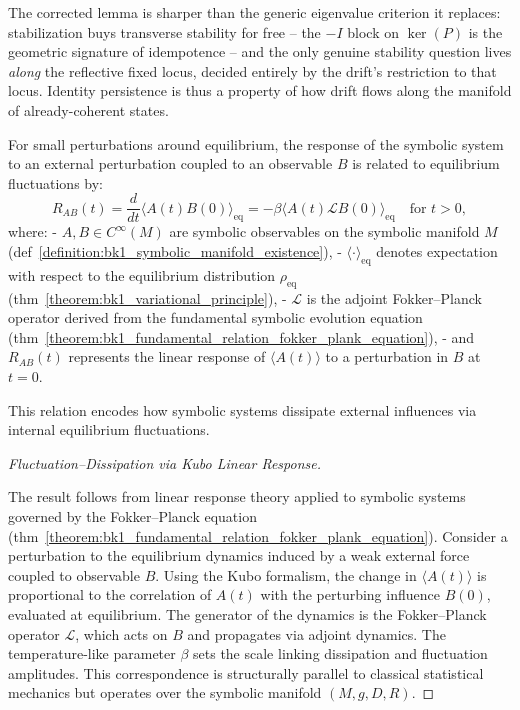 \begin{remark}
\label{remark:bk1_local_stability_interpretation}
The corrected lemma is sharper than the generic eigenvalue criterion it replaces: stabilization buys transverse stability for free -- the $-I$ block on $\ker(P)$ is the geometric signature of idempotence -- and the only genuine stability question lives \emph{along} the reflective fixed locus, decided entirely by the drift's restriction to that locus. Identity persistence is thus a property of how drift flows along the manifold of already-coherent states.
\end{remark}

\begin{theorem}
\label{theorem:bk1_symbolic_fluctuation_dissipation_relation}
For small perturbations around equilibrium, the response of the symbolic system to an external perturbation coupled to an observable $B$ is related to equilibrium fluctuations by:
\[
R_{AB}(t) = \frac{d}{dt} \langle A(t) B(0) \rangle_{\text{eq}} = -\beta \langle A(t) \mathcal{L} B(0) \rangle_{\text{eq}} \quad \text{for } t > 0,
\]
where:
- $A, B \in C^\infty(M)$ are symbolic observables on the symbolic manifold $M$ (def~\ref{definition:bk1_symbolic_manifold_existence}),
- $\langle \cdot \rangle_{\text{eq}}$ denotes expectation with respect to the equilibrium distribution $\rho_{\text{eq}}$ (thm~\ref{theorem:bk1_variational_principle}),
- $\mathcal{L}$ is the adjoint Fokker–Planck operator derived from the fundamental symbolic evolution equation (thm~\ref{theorem:bk1_fundamental_relation_fokker_plank_equation}),
- and $R_{AB}(t)$ represents the linear response of $\langle A(t) \rangle$ to a perturbation in $B$ at $t = 0$.

This relation encodes how symbolic systems dissipate external influences via internal equilibrium fluctuations.

\begin{proof}[Fluctuation--Dissipation via Kubo Linear Response]
\label{proof:bk1_sketch_fluctuation_dissipation}
\leavevmode

The result follows from linear response theory applied to symbolic systems governed by the Fokker–Planck equation (thm~\ref{theorem:bk1_fundamental_relation_fokker_plank_equation}). Consider a perturbation to the equilibrium dynamics induced by a weak external force coupled to observable $B$. Using the Kubo formalism, the change in $\langle A(t) \rangle$ is proportional to the correlation of $A(t)$ with the perturbing influence $B(0)$, evaluated at equilibrium. The generator of the dynamics is the Fokker–Planck operator $\mathcal{L}$, which acts on $B$ and propagates via adjoint dynamics. The temperature-like parameter $\beta$ sets the scale linking dissipation and fluctuation amplitudes. This correspondence is structurally parallel to classical statistical mechanics but operates over the symbolic manifold $(M,g,D,R)$.
\end{proof}
\end{theorem}
